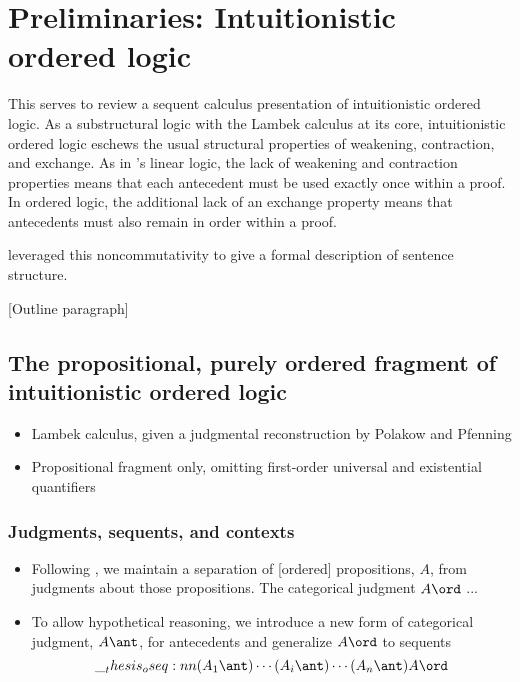 \chapter{Preliminaries: Intuitionistic ordered logic}\label{ch:ordered-logic}



This  serves to review a sequent calculus presentation of
intuitionistic ordered logic.
As a substructural logic with the Lambek calculus\autocite{Lambek:??} at its core, intuitionistic ordered logic eschews the usual structural properties of weakening, contraction, and exchange.
As in \citeauthor{Girard:TCS??}'s linear logic\autocite{Girard:TCS??}, the lack of weakening and contraction properties means that each antecedent must be used exactly once within a proof.
In ordered logic, the additional lack of an exchange property means that antecedents must also remain in order within a proof.

 leveraged this noncommutativity to give a formal description of sentence structure.



[Outline paragraph]


\section{The propositional, purely ordered fragment of intuitionistic ordered logic}

\begin{itemize}
\item Lambek calculus, given a judgmental reconstruction by Polakow and Pfenning
\item Propositional fragment only, omitting first-order universal and existential quantifiers
\end{itemize}

\subsection{Judgments, sequents, and contexts}

\begin{itemize}
\item Following \citeauthor{Martin-Lof:??}\autocite{Martin-Lof:??}, we maintain a separation of [ordered] propositions, $A$, from judgments about those propositions.
  The categorical judgment $A \ord$ ... 

\item To allow hypothetical reasoning, we introduce a new form of categorical judgment, $A \ant$, for antecedents and generalize $A \ord$ to sequents
  \begin{equation*}
    \oseq{(A_1 \ant) \dotsm (A_i \ant) \dotsm (A_n \ant) |- A \ord}
  \end{equation*}
\end{itemize}

